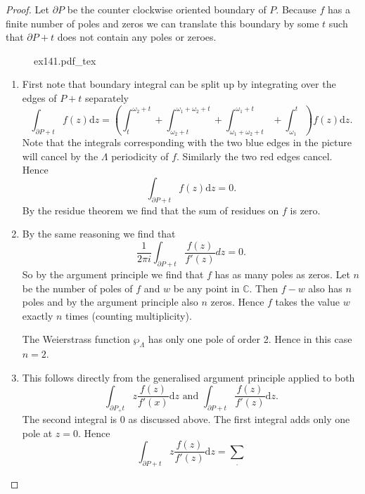 \documentclass[a4paper]{article}
\newcommand{\incfig}[1]{%
	\def\svgwidth{\columnwidth}
	{#1.pdf_tex}
}
\theoremstyle{theoremdd}
\theoremstyle{definitiondd}
\theoremstyle{remarkdd}
\newcommand{\C}{\mathbb{C}}
\begin{document}
\begin{proof}
	Let $\partial P$ be the counter clockwise oriented boundary of $P$. Because $f$ has a finite number of poles and zeros we can translate this boundary by some $t$ such that $\partial P + t$ does not contain any poles or zeroes.
\begin{figure}[h]
	\incfig{ex141}	
\end{figure}
\begin{enumerate}
	\item First note that boundary integral can be split up by integrating over the edges of $P + t$ separately\[
			\int_{\partial P+ t} f(z) \mathrm d z = \left(\int_t^{\omega_2 + t} + \int_{\omega_2+t}^{\omega_1 + \omega_2 + t} + \int_{\omega_1 + \omega_2 + t} ^{\omega_1 + t} + \int_{\omega_1}^{t}\right) f(z) \mathrm dz
	.\] 
	Note that the integrals corresponding with the two blue edges in the picture will cancel by the $\Lambda$ periodicity of $f$. Similarly the two red edges cancel. 
	Hence \[
		\int_{\partial P + t} f(z) \mathrm d z = 0
	.\] 
	By the residue theorem we find that the sum of residues on $f$ is zero.
	
\item By the same reasoning we find that \[
		\frac{1}{2\pi i}\int_{\partial P + t} \frac{f(z)}{f'(z)}dz = 0
.\] 
So by the argument principle we find that $f$ has as many poles as zeros. Let $n$ be the number of poles of $f$ and $w$ be any point in $\C$. 
Then $f - w$ also has $n$ poles and by the argument principle also $n$ zeros. 
Hence $f$ takes the value $w$ exactly $n$ times (counting multiplicity).

The Weierstrass function $\wp_{\Lambda}$ has only one pole of order 2. Hence in this case  $n = 2$.
\item 
	This follows directly from the generalised argument principle applied to both \[
		\int_{\partial P _+ t} z \frac{f(z)}{f'(x)} \mathrm d z \text{ and } \int_{\partial P + t} \frac{f(z)}{f'(z)} \mathrm d z
	.\] 
	The second integral is $0$ as discussed above. 
	The first integral adds only one pole at $z = 0$. Hence  \[
		\int_{\partial P + t} z \frac{f(z)}{f'(z)}\mathrm d z = \sum_
	.\]
\end{enumerate}
\end{proof}
\printbibliography
\end{document}
